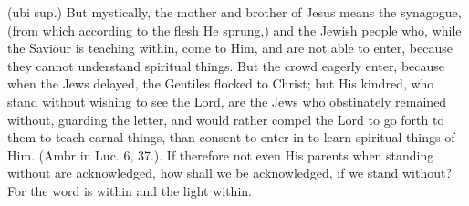  (ubi sup.) But mystically, the mother and brother of Jesus means the synagogue, (from which according to the flesh He sprung,) and the Jewish people who, while the Saviour is teaching within, come to Him, and are not able to enter, because they cannot understand spiritual things. But the crowd eagerly enter, because when the Jews delayed, the Gentiles flocked to Christ; but His kindred, who stand without wishing to see the Lord, are the Jews who obstinately remained without, guarding the letter, and would rather compel the Lord to go forth to them to teach carnal things, than consent to enter in to learn spiritual things of Him. (Ambr in Luc. 6, 37.). If therefore not even His parents when standing without are acknowledged, how shall we be acknowledged, if we stand without? For the word is within and the light within.


